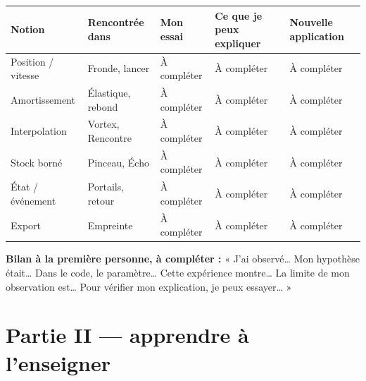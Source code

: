 \documentclass[
  canadien,
  11pt,
  letterpaper,
]{article}
\newcounter{none} %
\begin{document}
{\def\LTcaptype{none} %
\begin{longtable}[]{@{}
  >{\raggedright\arraybackslash}p{}
  >{\raggedright\arraybackslash}p{}
  >{\raggedright\arraybackslash}p{}
  >{\raggedright\arraybackslash}p{}
  >{\raggedright\arraybackslash}p{}@{}}
\toprule\noalign{}
\begin{minipage}[b]{\linewidth}\raggedright
Notion
\end{minipage} & \begin{minipage}[b]{\linewidth}\raggedright
Rencontrée dans
\end{minipage} & \begin{minipage}[b]{\linewidth}\raggedright
Mon essai
\end{minipage} & \begin{minipage}[b]{\linewidth}\raggedright
Ce que je peux expliquer
\end{minipage} & \begin{minipage}[b]{\linewidth}\raggedright
Nouvelle application
\end{minipage} \\
\midrule\noalign{}
\endhead
\bottomrule\noalign{}
\endlastfoot
Position / vitesse & Fronde, lancer & À compléter & À compléter & À
compléter \\
Amortissement & Élastique, rebond & À compléter & À compléter & À
compléter \\
Interpolation & Vortex, Rencontre & À compléter & À compléter & À
compléter \\
Stock borné & Pinceau, Écho & À compléter & À compléter & À compléter \\
État / événement & Portails, retour & À compléter & À compléter & À
compléter \\
Export & Empreinte & À compléter & À compléter & À compléter \\
\end{longtable}
}

\textbf{Bilan à la première personne, à compléter :} « J'ai
observé\ldots{} Mon hypothèse était\ldots{} Dans le code, le
paramètre\ldots{} Cette expérience montre\ldots{} La limite de mon
observation est\ldots{} Pour vérifier mon explication, je peux
essayer\ldots{} »

\section{Partie II --- apprendre à
l'enseigner}\label{partie-ii-apprendre-uxe0-lenseigner}
\end{document}
